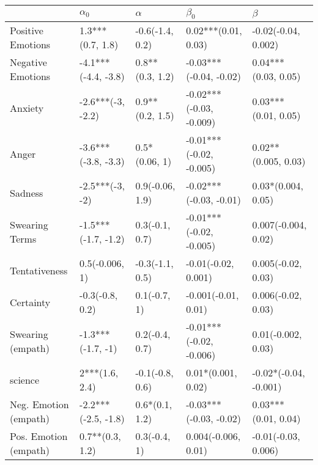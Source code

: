 \begin{tabular}{lllll}
\toprule
{} &           $\alpha_0$ &         $\alpha$ &                $\beta_0$ &                $\beta$ \\
\midrule
Positive Emotions     &     1.3***(0.7, 1.8) &  -0.6(-1.4, 0.2) &      0.02***(0.01, 0.03) &    -0.02(-0.04, 0.002) \\
Negative Emotions     &  -4.1***(-4.4, -3.8) &  0.8**(0.3, 1.2) &   -0.03***(-0.04, -0.02) &    0.04***(0.03, 0.05) \\
Anxiety               &    -2.6***(-3, -2.2) &  0.9**(0.2, 1.5) &  -0.02***(-0.03, -0.009) &    0.03***(0.01, 0.05) \\
Anger                 &  -3.6***(-3.8, -3.3) &    0.5*(0.06, 1) &  -0.01***(-0.02, -0.005) &    0.02**(0.005, 0.03) \\
Sadness               &      -2.5***(-3, -2) &  0.9(-0.06, 1.9) &   -0.02***(-0.03, -0.01) &     0.03*(0.004, 0.05) \\
Swearing Terms        &  -1.5***(-1.7, -1.2) &   0.3(-0.1, 0.7) &  -0.01***(-0.02, -0.005) &    0.007(-0.004, 0.02) \\
Tentativeness         &       0.5(-0.006, 1) &  -0.3(-1.1, 0.5) &      -0.01(-0.02, 0.001) &     0.005(-0.02, 0.03) \\
Certainty             &      -0.3(-0.8, 0.2) &     0.1(-0.7, 1) &      -0.001(-0.01, 0.01) &     0.006(-0.02, 0.03) \\
Swearing (empath)     &    -1.3***(-1.7, -1) &   0.2(-0.4, 0.7) &  -0.01***(-0.02, -0.006) &     0.01(-0.002, 0.03) \\
science               &       2***(1.6, 2.4) &  -0.1(-0.8, 0.6) &       0.01*(0.001, 0.02) &  -0.02*(-0.04, -0.001) \\
Neg. Emotion (empath) &  -2.2***(-2.5, -1.8) &   0.6*(0.1, 1.2) &   -0.03***(-0.03, -0.02) &    0.03***(0.01, 0.04) \\
Pos. Emotion (empath) &      0.7**(0.3, 1.2) &     0.3(-0.4, 1) &      0.004(-0.006, 0.01) &    -0.01(-0.03, 0.006) \\
\bottomrule
\end{tabular}
